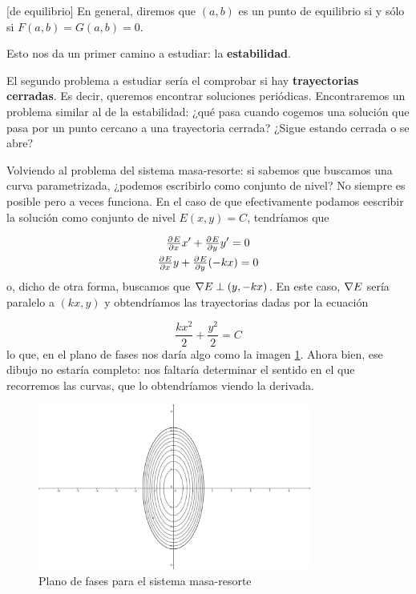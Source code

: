 \begin{definition}[de equilibrio]
En general, diremos que $(a,b)$ es un punto de equilibrio si y sólo si $F(a,b) = G(a,b) = 0$.
\end{definition}

Esto nos da un primer camino a estudiar: la \textbf{estabilidad}. 

El segundo problema a estudiar sería el comprobar si hay \textbf{trayectorias cerradas}. Es decir, queremos encontrar soluciones periódicas. Encontraremos un problema similar al de la estabilidad: ¿qué pasa cuando cogemos una solución que pasa por un punto cercano a una trayectoria cerrada? ¿Sigue estando cerrada o se abre? 

Volviendo al problema del sistema masa-resorte: si sabemos que buscamos una curva parametrizada, ¿podemos escribirlo como conjunto de nivel? No siempre es posible pero a veces funciona. En el caso de que efectivamente podamos eescribir la solución como conjunto de nivel $E(x,y) = C$, tendríamos que

\begin{gather*}
\pd{E}{x}  x' + \pd{E}{y}y' = 0 \\
\pd{E}{x} y + \pd{E}{y} (-kx) = 0
\end{gather*}
o, dicho de otra forma, buscamos que $\nabla E \perp (y,-kx)$. En este caso, $\nabla E$ sería paralelo a $(kx,y)$ y obtendríamos las trayectorias dadas por la ecuación

\[ \frac{kx^2}{2} + \frac{y^2}{2} = C 
\]
lo que, en el plano de fases nos daría algo como la imagen \ref{img:FasesMasaResorte}. Ahora bien, ese dibujo no estaría completo: nos faltaría determinar el sentido en el que recorremos las curvas, que lo obtendríamos viendo la derivada.

\begin{figure}[hbtp]
\centering
\includegraphics[width=0.8\textwidth]{img/PlanoFasesMasaResorte.png}
\caption{Plano de fases para el sistema masa-resorte}
\label{img:FasesMasaResorte}
\end{figure}

